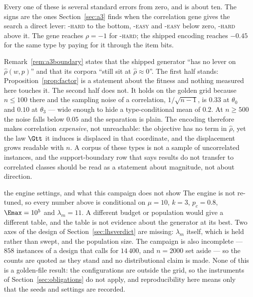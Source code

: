 Every one of these is several standard errors from zero, and  is about
ten. The signs are the ones Section~\ref{sec:a3} finds when the correlation gene gives the
search a direct lever: \DEF-\textsc{hard} to the bottom, \MINW-\textsc{easy} and
\MAXP-\textsc{easy} below zero, \MAXPW-\textsc{hard} above it. The gene reaches $\rho=-1$ for
\DEF-\textsc{hard}; the shipped encoding reaches $-0.45$ for the same type by paying for it
through the item bits.

\begin{remark}\label{rem:rhoqualify}
Remark~\ref{rem:a3boundary} states that the shipped generator ``has no lever on
$\hat\rho(w,p)$'' and that its corpora ``still sit at $\hat\rho\approx0$''. The first half
stands: Proposition~\ref{prop:factor} is a statement about the fitness and nothing measured
here touches it. The second half does not. It holds on the golden grid because $n\le100$ there
and the sampling noise of a correlation, $1/\sqrt{n-1}$, is $0.33$ at $\theta_0$ and $0.10$ at
$\theta_3$ --- wide enough to hide a type-conditional mean of $0.2$. At $n\ge500$ the noise
falls below $0.05$ and the separation is plain. The encoding therefore makes correlation
\emph{expensive}, not unreachable: the objective has no term in $\hat\rho$, yet the law $\Gtt$
it induces is displaced in that coordinate, and the displacement grows readable with $n$. A
corpus of these types is not a sample of uncorrelated instances, and the support-boundary row
that says results do not transfer to correlated classes should be read as a statement about
magnitude, not about direction.
\end{remark}

\begin{kept}{the engine settings, and what this campaign does not show}
The engine is not re-tuned, so every number above is conditional on $\mu=10$, $k=3$,
$p_c=0.8$, $\Emax=10^{5}$ and $\lambda_m=11$. A different budget or population would give a
different table, and the table is not evidence about the generator at its best. Two axes of
the design of Section~\ref{sec:lhsverdict} are missing: $\lambda_m$ itself, which is held
rather than swept, and the population size. The campaign is also incomplete --- $858$
instances of a design that calls for $14\,400$, and $n=2000$ set aside --- so the counts are
quoted as they stand and no distributional claim is made. None of this is a golden-file result:
the configurations are outside the grid, so the instruments of Section~\ref{sec:obligations}
do not apply, and reproducibility here means only that the seeds and settings are recorded.
\end{kept}
